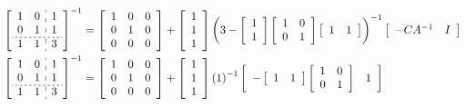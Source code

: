 \documentclass[12pt,a4paper]{paper}
\begin{document}
\begin{enumerate}
\begin{enumerate}
\begin{align*}
\left[\begin{array}{cc:c}1&0&1\\0&1&1\\\hdashline[2pt/2pt]1&1&3\end{array}\right]^{-1} &= \left[\begin{array}{ccc}1&0&0\\0&1&0\\0&0&0\end{array}\right] + \left[\begin{array}{c}1\\1\\1\end{array}\right]\left(3-\left[\begin{array}{c}1\\1\end{array}\right]\left[\begin{array}{cc}1 & 0\\0 & 1\end{array}\right]\left[\begin{array}{cc}1&1\end{array}\right]\right)^{-1}\left[\begin{array}{cc}-CA^{-1}&I\end{array}\right]\\
%
\left[\begin{array}{cc:c}1&0&1\\0&1&1\\\hdashline[2pt/2pt]1&1&3\end{array}\right]^{-1} &= \left[\begin{array}{ccc}1&0&0\\0&1&0\\0&0&0\end{array}\right] + \left[\begin{array}{c}1\\1\\1\end{array}\right]\left(1\right)^{-1}\left[\begin{array}{cc}-\left[\begin{array}{cc}1&1\end{array}\right]\left[\begin{array}{cc}1 & 0\\0 & 1\end{array}\right]&1\end{array}\right]\\
%

\end{align*}
\end{enumerate}
\end{enumerate}
\end{document}
